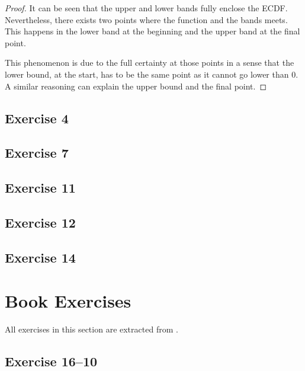 \documentclass[11pt]{article}
\theoremstyle{definition}
\theoremstyle{remark}
\theoremstyle{remark}
\begin{document}
\begin{proof}
  It can be seen that the upper and lower bands fully enclose the
  ECDF. Nevertheless, there exists two points where the function and
  the bands meets. This happens in the lower band at the beginning and
  the upper band at the final point.

  This phenomenon is due to the full certainty at those points in a
  sense that the lower bound, at the start, has to be the same point
  as it cannot go lower than 0. A similar reasoning can explain the
  upper bound and the final point.
\end{proof}

\subsection*{Exercise 4}

\subsection*{Exercise 7}

\subsection*{Exercise 11}

\subsection*{Exercise 12}

\subsection*{Exercise 14}

\section{Book Exercises}
All exercises in this section are extracted from \parencite{wasserman2006}.

\subsection*{Exercise 16--10}

\printbibliography
\end{document}
